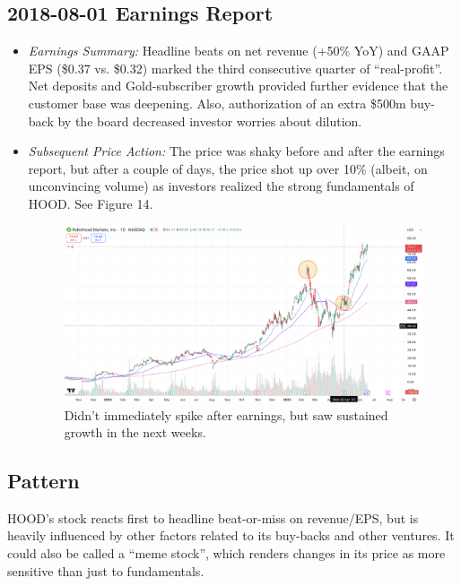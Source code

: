 \documentclass[11pt]{article}
\begin{document}
    \subsection{2018-08-01 Earnings Report}
        \begin{itemize}
            \item \textit{Earnings Summary:} Headline beats on net revenue (+50\% YoY) and GAAP EPS (\$0.37 vs. \$0.32) marked the third consecutive quarter of ``real-profit''. Net deposits and Gold-subscriber growth provided further evidence that the customer base was deepening. Also, authorization of an extra \$500m buy-back by the board decreased investor worries about dilution.
            \item \textit{Subsequent Price Action:} The price was shaky before and after the earnings report, but after a couple of days, the price shot up over 10\% (albeit, on unconvincing volume) as investors realized the strong fundamentals of HOOD. See Figure 14.
            \begin{figure}[h]
                \centering \includegraphics[width=0.8\linewidth]{images/HOOD2.png}
                \caption{Didn't immediately spike after earnings, but saw sustained growth in the next weeks.}
            \end{figure}
        \end{itemize}
    \subsection{Pattern}
        HOOD's stock reacts first to headline beat-or-miss on revenue/EPS, but is heavily influenced by other factors related to its buy-backs and other ventures. It could also be called a ``meme stock'', which renders changes in its price as more sensitive than just to fundamentals.
\end{document}
